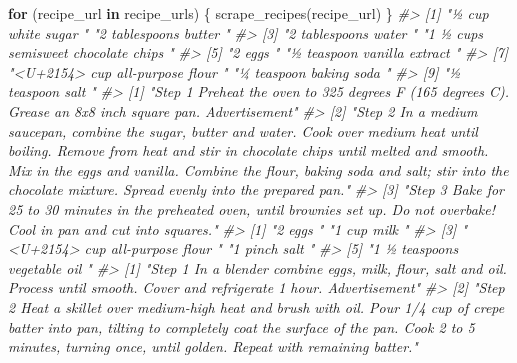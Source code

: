 \documentclass[
]{krantz}
\makeatletter
\newenvironment{Shaded}{\begin{snugshade}}{\end{snugshade}}
\newcommand{\CommentTok}[1]{\textcolor[rgb]{0.37,0.37,0.37}{\textit{#1}}}
\newcommand{\ControlFlowTok}[1]{\textcolor[rgb]{0.27,0.27,0.27}{\textbf{#1}}}
\newcommand{\FunctionTok}[1]{\textcolor[rgb]{0,0,0}{#1}}
\newcommand{\NormalTok}[1]{#1}
\newenvironment{kframe}{%
\medskip{}
\setlength{\fboxsep}{.8em}
 \def\at@end@of@kframe{}%
 \ifinner\ifhmode%
  \def\at@end@of@kframe{\end{minipage}}%
  \begin{minipage}{\columnwidth}%
 \fi\fi%
 \def\FrameCommand##1{\hskip\@totalleftmargin \hskip-\fboxsep
 \colorbox{shadecolor}{##1}\hskip-\fboxsep
     \hskip-\linewidth \hskip-\@totalleftmargin \hskip\columnwidth}%
 \MakeFramed {\advance\hsize-\width
   \@totalleftmargin\z@ \linewidth\hsize
   \@setminipage}}%
 {\par\unskip\endMakeFramed%
 \at@end@of@kframe}
\renewenvironment{Shaded}{\begin{kframe}}{\end{kframe}}
\makeatother
\begin{document}
\begin{Shaded}
\begin{Highlighting}[]
\ControlFlowTok{for}\NormalTok{ (recipe\_url }\ControlFlowTok{in}\NormalTok{ recipe\_urls) \{}
  \FunctionTok{scrape\_recipes}\NormalTok{(recipe\_url)}
\NormalTok{\}}
\CommentTok{\#\textgreater{} [1] "½ cup white sugar "                  "2 tablespoons butter "              }
\CommentTok{\#\textgreater{} [3] "2 tablespoons water "                "1 ½ cups semisweet chocolate chips "}
\CommentTok{\#\textgreater{} [5] "2 eggs "                             "½ teaspoon vanilla extract "        }
\CommentTok{\#\textgreater{} [7] "\textless{}U+2154\textgreater{} cup all{-}purpose flour "     "¼ teaspoon baking soda "            }
\CommentTok{\#\textgreater{} [9] "½ teaspoon salt "                   }
\CommentTok{\#\textgreater{} [1] "Step 1   Preheat the oven to 325 degrees F (165 degrees C). Grease an 8x8 inch square pan.    Advertisement"                                                                                                                                                                                                               }
\CommentTok{\#\textgreater{} [2] "Step 2   In a medium saucepan, combine the sugar, butter and water. Cook over medium heat until boiling. Remove from heat and stir in chocolate chips until melted and smooth. Mix in the eggs and vanilla. Combine the flour, baking soda and salt; stir into the chocolate mixture. Spread evenly into the prepared pan."}
\CommentTok{\#\textgreater{} [3] "Step 3   Bake for 25 to 30 minutes in the preheated oven, until brownies set up. Do not overbake! Cool in pan and cut into squares."                                                                                                                                                                                       }
\CommentTok{\#\textgreater{} [1] "2 eggs "                      "1 cup milk "                 }
\CommentTok{\#\textgreater{} [3] "\textless{}U+2154\textgreater{} cup all{-}purpose flour " "1 pinch salt "               }
\CommentTok{\#\textgreater{} [5] "1 ½ teaspoons vegetable oil "}
\CommentTok{\#\textgreater{} [1] "Step 1   In a blender combine eggs, milk, flour, salt and oil. Process until smooth. Cover and refrigerate 1 hour.    Advertisement"                                                                                                       }
\CommentTok{\#\textgreater{} [2] "Step 2   Heat a skillet over medium{-}high heat and brush with oil. Pour 1/4 cup of crepe batter into pan, tilting to completely coat the surface of the pan. Cook 2 to 5 minutes, turning once, until golden. Repeat with remaining batter."}

\end{Highlighting}
\end{Shaded}
\end{document}

